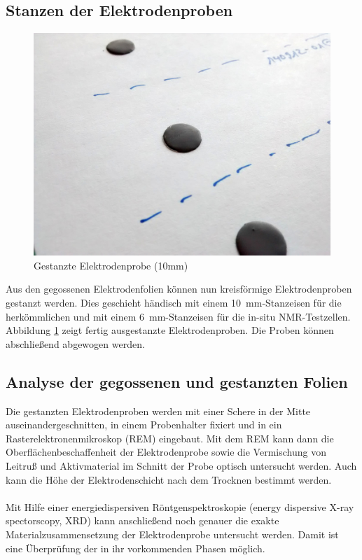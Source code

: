 \documentclass[a4paper, 11pt, headsepline,footsepline,twoside,abstract]{scrbook}
\begin{document}
\subsection{Stanzen der Elektrodenproben}
\begin{figure}
	\centering
	\includegraphics[width=0.9\columnwidth]{images/Kathodenprobe.jpg}
	\caption{Gestanzte Elektrodenprobe (10mm)}
	\label{elektrode_gestanzt}
\end{figure}
Aus den gegossenen Elektrodenfolien können nun kreisförmige Elektrodenproben gestanzt werden. Dies geschieht händisch mit einem \SI{10}{\milli\metre}-Stanzeisen für die herkömmlichen und mit einem \SI{6}{\milli\metre}-Stanzeisen für die in-situ NMR-Testzellen. Abbildung \ref{elektrode_gestanzt} zeigt fertig ausgestanzte Elektrodenproben. Die Proben können abschließend abgewogen werden.
\subsection{Analyse der gegossenen und gestanzten Folien}
Die gestanzten Elektrodenproben werden mit einer Schere in der Mitte auseinandergeschnitten, in einem Probenhalter fixiert und in ein Rasterelektronenmikroskop (REM) eingebaut. Mit dem REM kann dann die Oberflächenbeschaffenheit der Elektrodenprobe sowie die Vermischung von Leitruß und Aktivmaterial im Schnitt der Probe optisch untersucht werden. Auch kann die Höhe der Elektrodenschicht nach dem Trocknen bestimmt werden.
\\\\
Mit Hilfe einer energiedispersiven Röntgenspektroskopie (energy dispersive X-ray spectorscopy, XRD) kann anschließend noch genauer die exakte Materialzusammensetzung der Elektrodenprobe untersucht werden. Damit ist eine Überprüfung der in ihr vorkommenden Phasen möglich.
\end{document}
